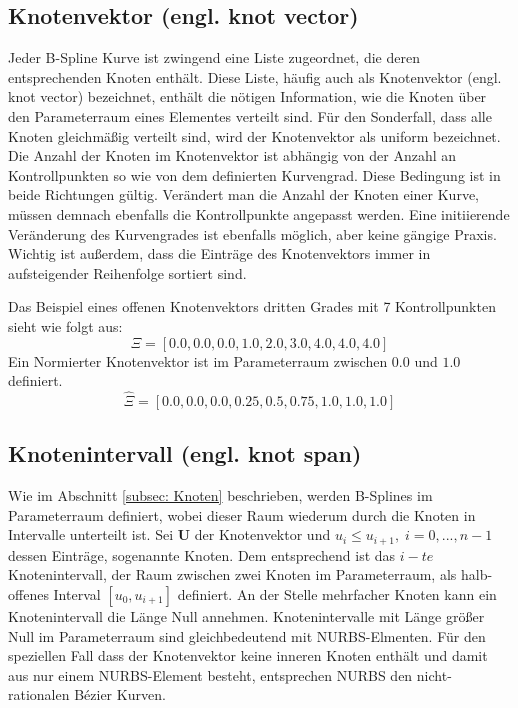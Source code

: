 \documentclass[german,a4paper,12pt,oneside]{scrbook}
\theoremstyle{definition}
\theoremstyle{definition}
\theoremstyle{definition}
\theoremstyle{definition}
\theoremstyle{definition}
\theoremstyle{definition}
\begin{document}
\subsection{Knotenvektor (engl. knot vector)}
\label{subsec:knot vector}
Jeder B-Spline Kurve ist zwingend eine Liste zugeordnet, die deren entsprechenden Knoten enthält. Diese Liste, häufig auch als Knotenvektor (engl. knot vector) bezeichnet, enthält die nötigen Information, wie die Knoten über den Parameterraum eines Elementes verteilt sind. Für den Sonderfall, dass alle Knoten gleichmäßig verteilt sind, wird der Knotenvektor als uniform bezeichnet.  Die Anzahl der Knoten im Knotenvektor ist abhängig von der Anzahl an Kontrollpunkten so wie von dem definierten Kurvengrad. Diese Bedingung ist in beide Richtungen gültig. Verändert man die Anzahl der Knoten einer Kurve, müssen demnach ebenfalls die Kontrollpunkte angepasst werden. Eine initiierende Veränderung des Kurvengrades ist ebenfalls möglich, aber keine gängige Praxis. Wichtig ist außerdem, dass die Einträge des Knotenvektors immer in aufsteigender Reihenfolge sortiert sind. 

Das Beispiel eines offenen Knotenvektors dritten Grades mit 7 Kontrollpunkten sieht wie folgt aus:
\begin{equation*}
    \Xi = [0.0, 0.0, 0.0, 1.0, 2.0, 3.0, 4.0, 4.0, 4.0]
\end{equation*}
Ein Normierter Knotenvektor ist im Parameterraum zwischen $0.0$ und $1.0$ definiert. 
\begin{equation*}
    \hat{\Xi} = [0.0, 0.0, 0.0, 0.25, 0.5, 0.75, 1.0, 1.0, 1.0]
\end{equation*}


\subsection{Knotenintervall (engl. knot span)}
\label{subsec: Knotenintervall}
Wie im Abschnitt \ref{subsec: Knoten} beschrieben, werden B-Splines im Parameterraum definiert, wobei dieser Raum wiederum durch die Knoten in Intervalle unterteilt ist. Sei $\bm{U}$ der Knotenvektor und $u_i \leq u_{i+1}, \; i = 0,...,n-1$  dessen Einträge, sogenannte Knoten. Dem entsprechend ist das $i-te$ Knotenintervall, der Raum zwischen zwei Knoten im Parameterraum, als halb-offenes Interval $[u_0, u_{i+1}]$ definiert. An der Stelle mehrfacher Knoten kann ein Knotenintervall die Länge Null annehmen. Knotenintervalle mit Länge größer Null im Parameterraum sind gleichbedeutend mit NURBS-Elmenten. Für den speziellen Fall dass der Knotenvektor keine inneren Knoten enthält und damit aus nur einem NURBS-Element besteht, entsprechen NURBS den nicht-rationalen Bézier Kurven. 
\end{document}
